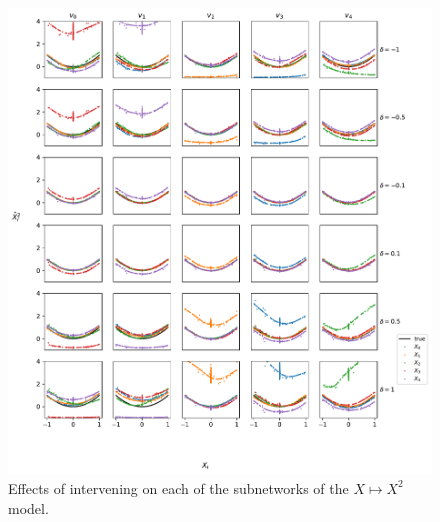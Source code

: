 \documentclass{article}
\theoremstyle{plain}
\theoremstyle{definition}
\theoremstyle{remark}
\begin{document}
\begin{figure}[ht]
    \centerline{\includegraphics[width=\textwidth]{../figures/s7_squared_intervention_more_deltas.pdf}}
    \centering
    \caption{Effects of intervening on each of the subnetworks of the $X \mapsto X^2$ model.}\label{fig:s7_squared_intervention_more_deltas}
\end{figure}
\end{document}
